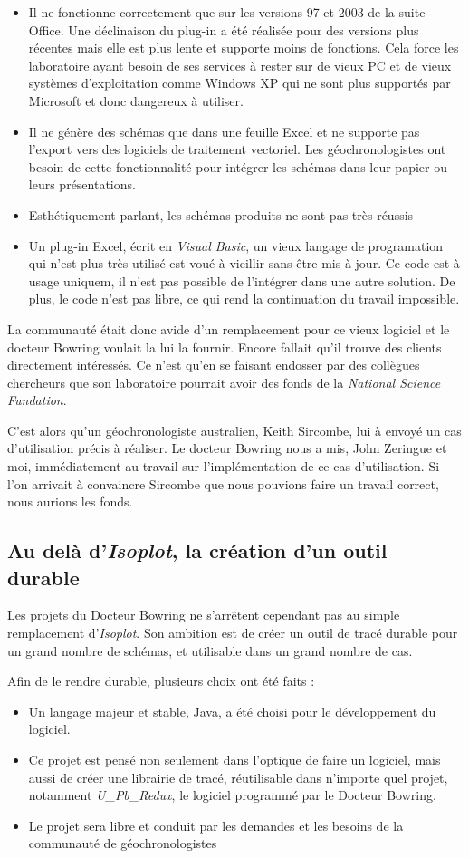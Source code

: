 \begin{itemize}
\item Il ne fonctionne correctement que sur les versions 97 et 2003 de la suite Office. Une déclinaison du plug-in a été réalisée pour des versions plus récentes mais elle est plus lente et supporte moins de fonctions. Cela force les laboratoire ayant besoin de ses services à rester sur de vieux PC et de vieux systèmes d'exploitation comme Windows XP qui ne sont plus supportés par Microsoft et donc dangereux à utiliser.
\item Il ne génère des schémas que dans une feuille Excel et ne supporte pas l'export vers des logiciels de traitement vectoriel. Les géochronologistes ont besoin de cette fonctionnalité pour intégrer les schémas dans leur papier ou leurs présentations.
\item Esthétiquement parlant, les schémas produits ne sont pas très réussis
\item Un plug-in Excel, écrit en \textit{Visual Basic}, un vieux langage de programation qui n'est plus très utilisé est voué à vieillir sans être mis à jour. Ce code est à usage uniquem, il n'est pas possible de l'intégrer dans une autre solution. De plus, le code n'est pas libre, ce qui rend la continuation du travail impossible.
\end{itemize}

La communauté était donc avide d'un remplacement pour ce vieux logiciel et le docteur Bowring voulait la lui la fournir. Encore fallait qu'il trouve des clients directement intéressés. Ce n'est qu'en se faisant endosser par des collègues chercheurs que son laboratoire pourrait avoir des fonds de la \textit{National Science Fundation}.

C'est alors qu'un géochronologiste australien, Keith Sircombe, lui à envoyé un cas d'utilisation précis à réaliser. Le docteur Bowring nous a mis, John Zeringue et moi, immédiatement au travail sur l'implémentation de ce cas d'utilisation. Si l'on arrivait à convaincre Sircombe que nous pouvions faire un travail correct, nous aurions les fonds.

\subsection{Au delà d'\textit{Isoplot}, la création d'un outil durable}
Les projets du Docteur Bowring ne s'arrêtent cependant pas au simple remplacement d'\textit{Isoplot}. Son ambition est de créer un outil de tracé durable pour un grand nombre de schémas, et utilisable dans un grand nombre de cas.

Afin de le rendre durable, plusieurs choix ont été faits : 
\begin{itemize}
\item Un langage majeur et stable, Java, a été choisi pour le développement du logiciel.
\item Ce projet est pensé non seulement dans l'optique de faire un logiciel, mais aussi de créer une librairie de tracé, réutilisable dans n'importe quel projet, notamment \textit{U\_Pb\_Redux}, le logiciel programmé par le Docteur Bowring.
\item Le projet sera libre et conduit par les demandes et les besoins de la communauté de géochronologistes
\end{itemize}
